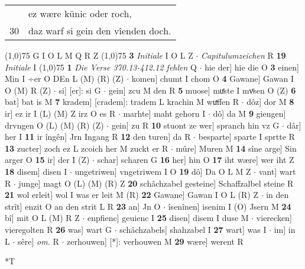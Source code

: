 \documentclass[8pt,a4paper,notitlepage]{article}
\begin{document}
\begin{table}[ht]
\begin{minipage}[t]{0.5\linewidth}
\begin{tabular}{rl}
 & ez wære künic oder roch,\\ 
30 & daz warf si gein den vîenden doch.\\ 
\end{tabular}
\scriptsize
\line(1,0){75} \newline
G I O L M Q R Z \newline
\line(1,0){75} \newline
\textbf{3} \textit{Initiale} I O L Z   $\cdot$ \textit{Capitulumzeichen} R  \textbf{19} \textit{Initiale} I  \newline
\line(1,0){75} \newline
\textbf{1} \textit{Die Verse 370.13-412.12 fehlen} Q   $\cdot$ hie der] hie die O \textbf{3} einen] Min I ÷er O DEn L (M) (R) (Z)  $\cdot$ komen] chumt I chom O \textbf{4} Gawane] Gawan I O (M) R (Z)  $\cdot$ si] [er]: si G  $\cdot$ gein] zcu M den R \textbf{5} muose] muͤste I mvͦsen O (Z) \textbf{6} bat] bat is M \textbf{7} kradem] [cradem]: tradem L krachin M wuͯffen R  $\cdot$ dôz] dor M \textbf{8} ir] ez ir I (L) (M) Z irz O es R  $\cdot$ marhte] maht gehorn I  $\cdot$ dô] da M \textbf{9} giengen] drvngen O (L) (M) (R) (Z)  $\cdot$ gein] zu R \textbf{10} stuont ze wer] spranch hin vz G  $\cdot$ dâr] her I \textbf{11} ir îngên] Jrn Ingang R \textbf{12} den turen] da R  $\cdot$ besparte] sparte I sprtte R \textbf{13} zucter] zoch ez L zcoich her M zuckt er R  $\cdot$ mûre] Muren M \textbf{14} sîne arge] Sin arger O \textbf{15} ir] der I (Z)  $\cdot$ schar] scharen G \textbf{16} her] hin O \textbf{17} iht wære] wer iht Z \textbf{18} disem] disen I  $\cdot$ ungetriwen] vngetriwem I O \textbf{19} dô] Da O L M Z  $\cdot$ vant] wart R  $\cdot$ junge] magt O (L) (M) (R) Z \textbf{20} schâchzabel gesteine] Schaffzalbel steine R \textbf{21} wol erleit] wol I was er leit M (R) \textbf{22} Gawane] Gawan I O L (R) Z  $\cdot$ in den strît] enzit O an den strit L R \textbf{23} an] Jn O  $\cdot$ îsenînen] isenim I (O) Jsern M \textbf{24} bî] mit O L (M) R Z  $\cdot$ enpfienc] geuienc I \textbf{25} disen] disem I duse M  $\cdot$ vierecken] vieregolten R \textbf{26} was] wart G  $\cdot$ schâchzabels] shahzabel I \textbf{27} wart] was I  $\cdot$ im] in L  $\cdot$ sêre] \textit{om.} R  $\cdot$ zerhouwen] [*]: verhouwen M \textbf{29} wære] werent R \newline
\end{minipage}
\hspace{0.5cm}
\begin{minipage}[t]{0.5\linewidth}
\small
\begin{center}*T
\end{center}

\end{minipage}
\end{table}
\end{document}
